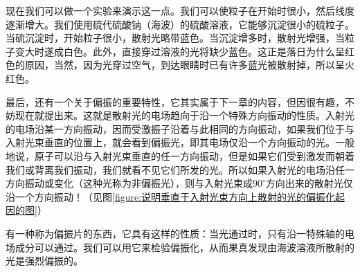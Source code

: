 现在我们可以做一个实验来演示这一点。我们可以使粒子在开始时很小，然后线度逐渐增大。我们使用硫代硫酸钠（海波）的硫酸溶液，它能够沉淀很小的硫粒子。当硫沉淀时，开始粒子很小，散射光略带蓝色。当沉淀增多时，散射光增强，当粒子变大时遂成白色。此外，直接穿过溶液的光将缺少蓝色。这正是落日为什么呈红色的原因，当然，因为光穿过空气，到达眼睛时已有许多蓝光被散射掉，所以呈火红色。

最后，还有一个关于偏振的重要特性，它其实属于下一章的内容，但因很有趣，不妨现在就提出来。这就是散射光的电场趋向于沿一个特殊方向振动的性质。入射光的电场沿某一方向振动，因而受激振子沿着与此相同的方向振动，如果我们位于与入射光束垂直的位置上，就会看到偏振光，即其电场仅沿一个方向振动的光。一般地说，原子可以沿与入射光束垂直的任一方向振动，但是如果它们受到激发而朝着我们或背离我们振动，我们就看不见它们所发的光。所以如果入射光的电场沿任一方向振动或变化（这种光称为非偏振光），则与入射光束成$90^\circ$方向出来的散射光仅沿一个方向振动！（见图\ref{figure:说明垂直于入射光束方向上散射的光的偏振化起因的图}）

有一种称为偏振片的东西，它具有这样的性质：当光通过时，只有沿一特殊轴的电场成分可以通过。我们可以用它来检验偏振化，从而果真发现由海波溶液所散射的光是强烈偏振的。